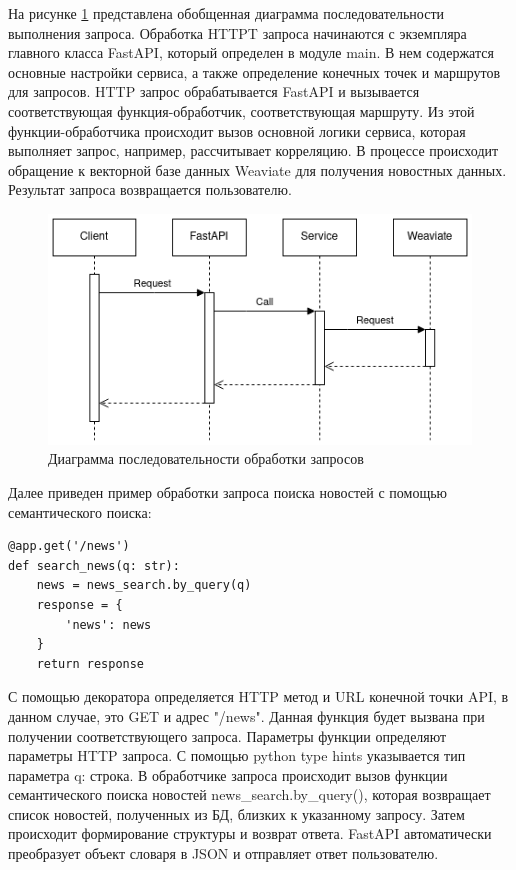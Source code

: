 На рисунке \ref{img:sequence-diagram} представлена обобщенная диаграмма последовательности выполнения запроса. Обработка HTTPT запроса начинаются с экземпляра главного класса FastAPI, который определен в модуле main. В нем содержатся основные настройки сервиса, а также определение конечных точек и маршрутов для запросов. HTTP запрос обрабатывается FastAPI и вызывается соответствующая функция-обработчик, соответствующая маршруту. Из этой функции-обработчика происходит вызов основной логики сервиса, которая выполняет запрос, например, рассчитывает корреляцию. В процессе происходит обращение к векторной базе данных Weaviate для получения новостных данных. Результат запроса возвращается пользователю.

\begin{figure}[h]
    \centering
    \includegraphics[width=\linewidth]{images/sequence-diagram.png}
    \caption{Диаграмма последовательности обработки запросов}
    \label{img:sequence-diagram}
\end{figure}


 Далее приведен пример обработки запроса поиска новостей с помощью семантического поиска:

\begin{lstlisting}
@app.get('/news')
def search_news(q: str):
    news = news_search.by_query(q)
    response = {
        'news': news
    }
    return response
\end{lstlisting}

С помощью декоратора определяется HTTP метод и URL конечной точки API, в данном случае, это GET и адрес "/news". Данная функция будет вызвана при получении соответствующего запроса. Параметры функции определяют параметры HTTP запроса. С помощью python type hints указывается тип параметра q: строка. В обработчике запроса происходит вызов функции семантического поиска новостей news\_search.by\_query(), которая возвращает список новостей, полученных из БД, близких к указанному запросу. Затем происходит формирование структуры и возврат ответа. FastAPI автоматически преобразует объект словаря в JSON и отправляет ответ пользователю.

